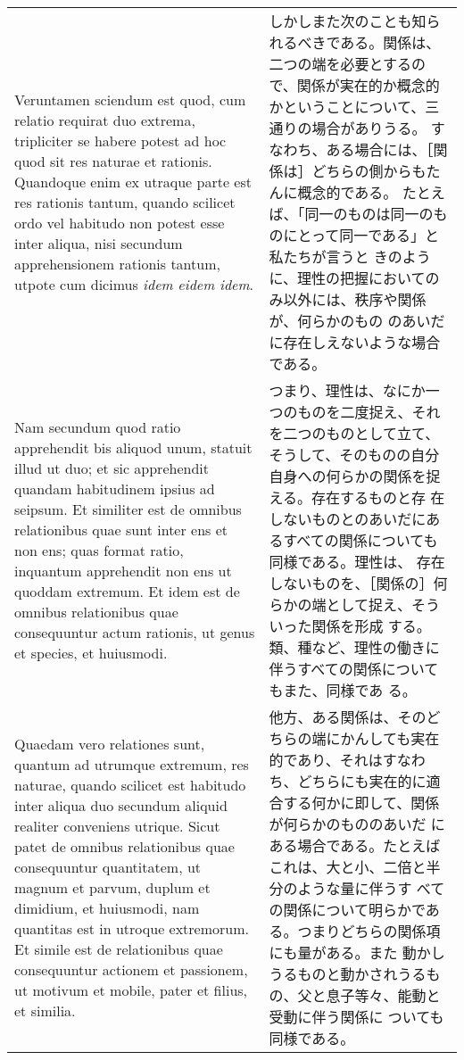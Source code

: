 \documentclass[paper=a4paper,fontsize=10pt,jafontsize=9pt,titlepage]{jlreq}
\begin{document}
\begin{longtable}{p{21em}p{21em}}
\\

Veruntamen sciendum est quod, cum relatio requirat duo extrema,
tripliciter se habere potest ad hoc quod sit res naturae et
rationis. Quandoque enim ex utraque parte est res rationis tantum,
quando scilicet ordo vel habitudo non potest esse inter aliqua, nisi
secundum apprehensionem rationis tantum, utpote cum dicimus {\itshape
idem eidem idem}.

&

しかしまた次のことも知られるべきである。関係は、二つの端を必要とするの
で、関係が実在的か概念的かということについて、三通りの場合がありうる。
すなわち、ある場合には、［関係は］どちらの側からもたんに概念的である。
たとえば、「同一のものは同一のものにとって同一である」と私たちが言うと
きのように、理性の把握においてのみ以外には、秩序や関係が、何らかのもの
のあいだに存在しえないような場合である。

\\

Nam secundum quod ratio apprehendit bis aliquod unum, statuit illud ut
duo; et sic apprehendit quandam habitudinem ipsius ad seipsum. Et
similiter est de omnibus relationibus quae sunt inter ens et non ens;
quas format ratio, inquantum apprehendit non ens ut quoddam
extremum. Et idem est de omnibus relationibus quae consequuntur actum
rationis, ut genus et species, et huiusmodi.

&

つまり、理性は、なにか一つのものを二度捉え、それを二つのものとして立て、
そうして、そのものの自分自身への何らかの関係を捉える。存在するものと存
在しないものとのあいだにあるすべての関係についても同様である。理性は、
存在しないものを、［関係の］何らかの端として捉え、そういった関係を形成
する。類、種など、理性の働きに伴うすべての関係についてもまた、同様であ
る。

\\

Quaedam vero relationes sunt, quantum ad utrumque extremum, res
naturae, quando scilicet est habitudo inter aliqua duo secundum
aliquid realiter conveniens utrique. Sicut patet de omnibus
relationibus quae consequuntur quantitatem, ut magnum et parvum,
duplum et dimidium, et huiusmodi, nam quantitas est in utroque
extremorum. Et simile est de relationibus quae consequuntur actionem
et passionem, ut motivum et mobile, pater et filius, et similia.

&

他方、ある関係は、そのどちらの端にかんしても実在的であり、それはすなわ
ち、どちらにも実在的に適合する何かに即して、関係が何らかのもののあいだ
にある場合である。たとえばこれは、大と小、二倍と半分のような量に伴うす
べての関係について明らかである。つまりどちらの関係項にも量がある。また
動かしうるものと動かされうるもの、父と息子等々、能動と受動に伴う関係に
ついても同様である。


\end{longtable}
\end{document}
